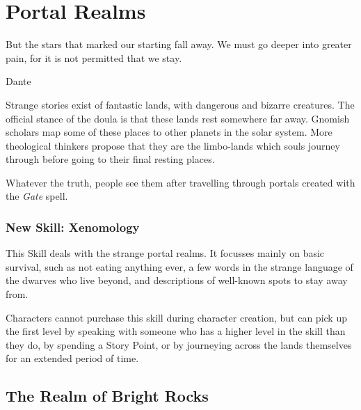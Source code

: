 \chapter{Portal Realms}
\label{ether}
\label{portalRealms}

\epigraph{But the stars that marked our starting fall away.
We must go deeper into greater pain,
for it is not permitted that we stay.}{Dante}

\begin{multicols}{2}

\noindent
Strange stories exist of fantastic lands, with dangerous and bizarre creatures.  The official stance of the \gls{doula} is that these lands rest somewhere far away.
Gnomish scholars map some of these places to other planets in the solar system.
More theological thinkers propose that they are the limbo-lands which souls journey through before going to their final resting places.

Whatever the truth, people see them after travelling through portals created with the \textit{Gate} spell.

\subsection{New Skill: Xenomology}
\label{Xenomology}

This Skill deals with the strange portal realms.
It focusses mainly on basic survival, such as not eating anything ever, a few words in the strange language of the dwarves who live beyond, and descriptions of well-known spots to stay away from.

Characters cannot purchase this skill during character creation, but can pick up the first level by speaking with someone who has a higher level in the skill than they do, by spending a Story Point, or by journeying across the lands themselves for an extended period of time.

\end{multicols}

\section{The Realm of Bright Rocks}
\label{brightrocks}

